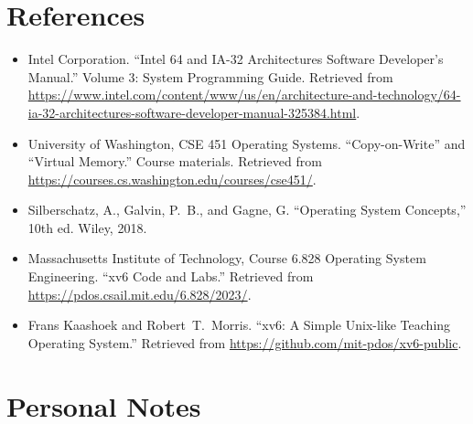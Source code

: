 \documentclass[11pt]{article}
\begin{document}
\section{References}

\begin{itemize}
    \item Intel Corporation. ``Intel 64 and IA-32 Architectures Software Developer's Manual.'' Volume 3: System Programming Guide. Retrieved from \url{https://www.intel.com/content/www/us/en/architecture-and-technology/64-ia-32-architectures-software-developer-manual-325384.html}.

    \item University of Washington, CSE 451 Operating Systems. ``Copy-on-Write'' and ``Virtual Memory.'' Course materials. Retrieved from \url{https://courses.cs.washington.edu/courses/cse451/}.

    \item Silberschatz, A., Galvin, P.~B., and Gagne, G. ``Operating System Concepts,'' 10th ed. Wiley, 2018.

    \item Massachusetts Institute of Technology, Course 6.828 Operating System Engineering. ``xv6 Code and Labs.'' Retrieved from \url{https://pdos.csail.mit.edu/6.828/2023/}.

    \item Frans Kaashoek and Robert~T.\ Morris. ``xv6: A Simple Unix-like Teaching Operating System.'' Retrieved from \url{https://github.com/mit-pdos/xv6-public}.
\end{itemize}

\section*{Personal Notes}
\end{document}
